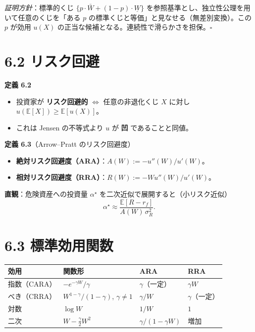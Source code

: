 \documentclass[11pt,a4paper]{report}
\begin{document}
\emph{証明方針}：標準的くじ $\{p \cdot \bar W + (1-p) \cdot \underline W\}$ を参照基準とし、独立性公理を用いて任意のくじを「ある $p$ の標準くじと等価」と見なせる（無差別変換）。この $p$ が効用 $u(X)$ の正当な候補となる。連続性で滑らかさを担保。$\square$

\section{6.2 リスク回避}

\textbf{定義 6.2}
\begin{itemize}
\item 投資家が \textbf{リスク回避的} $\iff$ 任意の非退化くじ $X$ に対し $u(\mathbb{E}[X]) \ge \mathbb{E}[u(X)]$。
\item これは Jensen の不等式より $u$ が \textbf{凹} であることと同値。
\end{itemize}

\textbf{定義 6.3}（Arrow–Pratt のリスク回避度）
\begin{itemize}
\item \textbf{絶対リスク回避度（ARA）}：$A(W) := -u''(W) / u'(W)$。
\item \textbf{相対リスク回避度（RRA）}：$R(W) := -W u''(W) / u'(W)$。
\end{itemize}

\textbf{直観}：危険資産への投資量 $\alpha^\star$ を二次近似で展開すると（小リスク近似） \[ \alpha^\star \approx \frac{\mathbb{E}[R - r_f]}{A(W)\, \sigma_R^2}. \]

\section{6.3 標準効用関数}

\begin{center}
\begin{tabular}{|l|l|l|l|}
\hline
効用 & 関数形 & ARA & RRA \\ \hline
指数（CARA） & $-e^{-\gamma W}/\gamma$ & $\gamma$（一定） & $\gamma W$ \\ \hline
べき（CRRA） & $W^{1-\gamma}/(1-\gamma)$, $\gamma\neq 1$ & $\gamma/W$ & $\gamma$（一定） \\ \hline
対数 & $\log W$ & $1/W$ & $1$ \\ \hline
二次 & $W - \tfrac{\gamma}{2}W^2$ & $\gamma/(1-\gamma W)$ & 増加 \\ \hline
\end{tabular}
\end{center}
\end{document}
